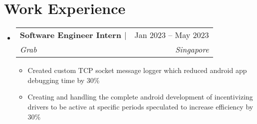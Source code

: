 \documentclass[letterpaper,11pt]{article}
\makeatletter
\newcommand{\resumeItem}[1]{
  \item\small{
    {#1 \vspace{-2.5pt}}
  }
}
\newcommand{\resumeSubheading}[4]{
  \vspace{-2pt}\item
    \begin{tabular*}{0.97\textwidth}[t]{l@{\extracolsep{\fill}}r}
      \textbf{#1} & #2 \\
      \textit{\small#3} & \textit{\small #4} \\
    \end{tabular*}\vspace{-7pt}
}
\newcommand{\resumeSubSubheading}[2]{
    \item
    \begin{tabular*}{0.97\textwidth}{l@{\extracolsep{\fill}}r}
      \textit{\small#1} & \textit{\small #2} \\
    \end{tabular*}\vspace{-7pt}
}
\newcommand{\resumeSubHeadingListStart}{\begin{itemize}[leftmargin=0.15in, label={}]}
\newcommand{\resumeSubHeadingListEnd}{\end{itemize}}
\newcommand{\resumeItemListStart}{\begin{itemize}}
\newcommand{\resumeItemListEnd}{\end{itemize}\vspace{-5pt}}
\makeatother
\begin{document}
\section{Work Experience}
  \resumeSubHeadingListStart
    \resumeSubheading
      {Software Engineer Intern  $|$ \normalfont {\emph{Kotlin, Java, Git, RxJava, Dagger, Android Studio}}}{Jan 2023 -- May 2023}
      {Grab}{Singapore}
      \resumeItemListStart
        \resumeItem{Created custom TCP socket message logger which reduced android app debugging time by 30\%}
        \resumeItem{Creating and handling the complete android development of incentivizing drivers to be active at specific periods speculated to increase efficiency by 30\%}
    \resumeItemListEnd
      


    
     

  \resumeSubHeadingListEnd


\end{document}
